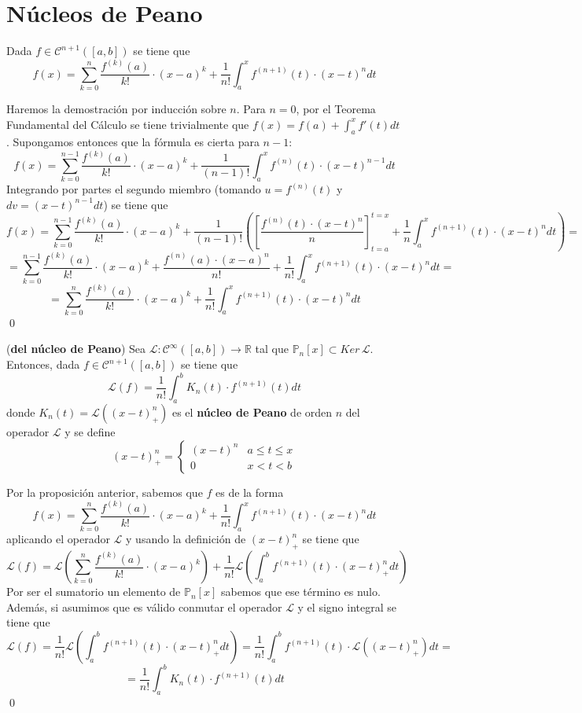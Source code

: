         \section{N{\'u}cleos de Peano}
        \begin{prop}
        Dada $f\in\mathcal{C}^{n+1}([a,b])$ se tiene que
        $$f(x)=\sum_{k=0}^n\dfrac{f^{(k)}(a)}{k!}\cdot (x-a)^k+\dfrac{1}{n!}\int_a^x f^{(n+1)}(t)\cdot (x-t)^ndt$$
        \end{prop} 
        \begin{dem}
        Haremos la demostración por inducción sobre $n$. Para $n=0$, por el Teorema Fundamental del Cálculo se tiene trivialmente que $f(x)=f(a)+\int_a^xf'(t)dt$. Supongamos entonces que la fórmula es cierta para $n-1$:
        $$f(x)=\sum_{k=0}^{n-1}\dfrac{f^{(k)}(a)}{k!}\cdot (x-a)^k+\dfrac{1}{(n-1)!}\int_a^x f^{(n)}(t)\cdot (x-t)^{n-1}dt$$
        Integrando por partes el segundo miembro (tomando $u=f^{(n)}(t)$ y $dv=(x-t)^{n-1}dt$) se tiene que
        $$f(x)=\sum_{k=0}^{n-1}\dfrac{f^{(k)}(a)}{k!}\cdot (x-a)^k+\dfrac{1}{(n-1)!}\left( \left[\dfrac{f^{(n)}(t)\cdot (x-t)^n}{n}\right]_{t=a}^{t=x}+\dfrac{1}{n}\int_a^x f^{(n+1)}(t)\cdot (x-t)^ndt\right)=$$
        $$=\sum_{k=0}^{n-1}\dfrac{f^{(k)}(a)}{k!}\cdot (x-a)^k+\dfrac{f^{(n)}(a)\cdot (x-a)^n}{n!}+\dfrac{1}{n!}\int_a^x f^{(n+1)}(t)\cdot (x-t)^ndt=$$
        $$=\sum_{k=0}^n\dfrac{f^{(k)}(a)}{k!}\cdot (x-a)^k+\dfrac{1}{n!}\int_a^x f^{(n+1)}(t)\cdot (x-t)^ndt$$
        \qed\end{dem}
        \begin{teo}
        (\textbf{del núcleo de Peano}) Sea $\mathcal{L}:\mathcal{C}^{\infty}([a,b])\longrightarrow \mathbb{R}$ tal que $\mathbb{P}_n[x]\subset Ker\, \mathcal{L}$. Entonces, dada $f\in\mathcal{C}^{n+1}([a,b])$ se tiene que
        $$\mathcal{L}(f)=\dfrac{1}{n!}\int_a^b K_n(t)\cdot f^{(n+1)}(t)dt$$
        donde $K_n(t)=\mathcal{L}((x-t)_+^n)$ es el \textbf{núcleo de Peano} de orden $n$ del operador $\mathcal{L}$ y se define
        $$(x-t)_+^n=\left\{\begin{array}{cc}
             (x-t)^n & a\leq t\leq x  \\
             0 & x<t<b 
        \end{array}\right.$$
        \end{teo}
        \begin{dem}
        Por la proposición anterior, sabemos que $f$ es de la forma
        $$f(x)=\sum_{k=0}^n\dfrac{f^{(k)}(a)}{k!}\cdot (x-a)^k+\dfrac{1}{n!}\int_a^x f^{(n+1)}(t)\cdot (x-t)^ndt$$
        aplicando el operador $\mathcal{L}$ y usando la definición de $(x-t)_+^n$ se tiene que
        $$\mathcal{L}(f)=\mathcal{L}\left(\sum_{k=0}^n\dfrac{f^{(k)}(a)}{k!}\cdot (x-a)^k\right)+\dfrac{1}{n!}\mathcal{L}\left(\int_a^b f^{(n+1)}(t)\cdot (x-t)_+^ndt\right)$$
        Por ser el sumatorio un elemento de $\mathbb{P}_n[x]$ sabemos que ese término es nulo. Además, si asumimos que es válido conmutar el operador $\mathcal{L}$ y el signo integral se tiene que
        $$\mathcal{L}(f)=\dfrac{1}{n!}\mathcal{L}\left(\int_a^b f^{(n+1)}(t)\cdot (x-t)_+^ndt\right)=\dfrac{1}{n!}\int_a^b f^{(n+1)}(t)\cdot\mathcal{L}( (x-t)_+^n)dt=$$
        $$=\dfrac{1}{n!}\int_a^b K_n(t)\cdot f^{(n+1)}(t)dt$$
        \qed\end{dem}
